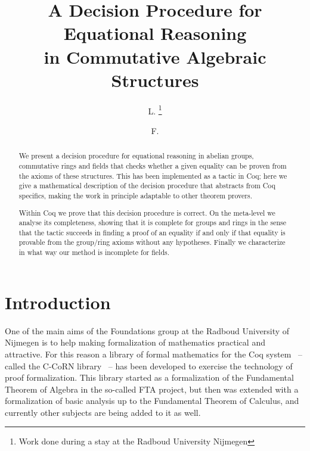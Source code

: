 \documentclass[numreferences]{kluwer}
\begin{document}
\begin{article}
\begin{opening}
\title{A Decision Procedure for Equational Reasoning\\
in Commutative Algebraic Structures}
\author{L. \thanks{Work done during a stay at the
Radboud University Nijmegen}}
\author{F. }

\begin{abstract}
We present a decision procedure for equational reasoning in abelian groups,
commutative rings and fields that checks whether a given equality can
be proven from the axioms of these structures.
This has been implemented as a tactic in Coq; here we give a mathematical
description of the decision procedure that abstracts from Coq specifics,
making the work in principle adaptable to other theorem provers.

Within Coq we prove that this decision procedure is correct.
On the meta-level we analyse its completeness, showing that it is complete
for groups and rings in the sense that the tactic succeeds in finding a
proof of an equality if and only if that equality is provable from
the group/ring axioms without any hypotheses.
Finally we characterize in what way our method is incomplete for
fields.
\end{abstract}
\end{opening}

\section{Introduction}

One of the main aims of the Foundations group at the Radboud
University of Nijmegen is to help making formalization of mathematics
practical and attractive.
For this reason a library of formal mathematics for the Coq
system~\cite{coqmanual} -- called the C-CoRN
library~\cite{lcf:geu:wie:04} -- has been developed to exercise the
technology of proof formalization.
This library started as a formalization of the Fundamental Theorem of
Algebra in the so-called FTA project, but then was extended with a
formalization of basic analysis up to the Fundamental Theorem of
Calculus, and currently other subjects are being added to it as well.


\end{article}
\end{document}
